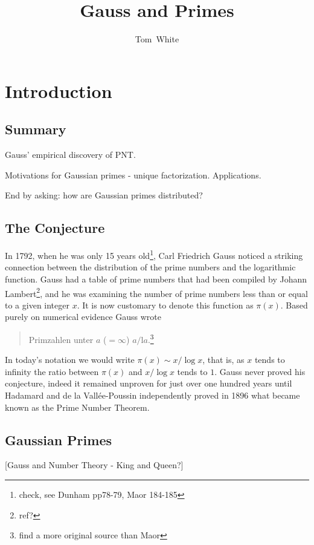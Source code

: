 \documentclass[a4paper]{article}
\author{Tom~White}
\title{Gauss and Primes}
\begin{document}
\maketitle

\section{Introduction}

\subsection{Summary}

Gauss' empirical discovery of PNT.

Motivations for Gaussian primes - unique factorization. Applications.

End by asking: how are Gaussian primes distributed?

\subsection{The Conjecture}
In 1792, when he was only 15 years old\footnote{check, see Dunham pp78-79, Maor 184-185},
Carl Friedrich Gauss noticed a striking
connection between the distribution of the prime numbers and the logarithmic function.
Gauss had a table of prime numbers that had been compiled by Johann Lambert\footnote{ref?}, and
he was examining the number of prime numbers less than or equal to a given integer $x$.
It is now customary to denote this function as $\pi(x)$. Based purely on numerical evidence 
Gauss wrote
\begin{quote}
Primzahlen unter $a$ ($=\infty$) $a/\textrm{l}a$.\footnote{find a more original source than Maor}
\end{quote}
In today's notation we would write $\pi(x) \sim x/\log x$, that is, as $x$ tends to infinity
the ratio between $\pi(x)$ and $x/\log x$ tends to $1$. Gauss never proved his conjecture, indeed
it remained unproven for just over one hundred years until Hadamard and de la Vall\'ee-Poussin
independently proved in 1896 what became known as the Prime Number Theorem.

\subsection{Gaussian Primes}

[Gauss and Number Theory - King and Queen?]
\end{document}
